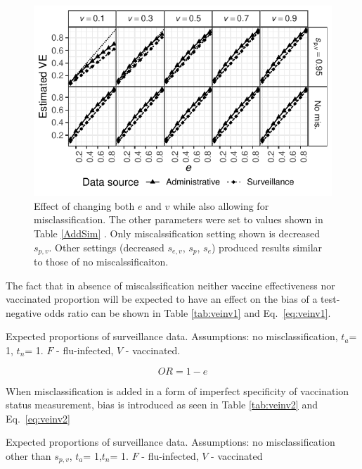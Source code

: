 \documentclass[11pt]{article}
\begin{document}
\pagebreak

\begin{figure}[H]
	\centering
		\includegraphics[width=0.85\linewidth]{../fig-veinv/veinv-limited.pdf}
		\caption{
Effect of changing both $e$ and $v$ while also allowing for misclassification. The other parameters were set to values shown in Table \ref{AddSim} . Only miscalssification setting shown is decreased $s_{p,v}$. Other settings (decreased $s_{e,v}$,  $s_p$, $s_e$) produced results similar to those of no miscalssificaiton. \label{veinv-summ}
		}	
\end{figure}

The fact that in absence of miscalssification neither vaccine effectiveness nor vaccinated proportion will be expected to have an effect on the bias of a test-negative odds ratio can be shown in Table \ref{tab:veinv1} and Eq.\ \ref{eq:veinv1}.

\begin{table}[h]
\centering
\caption{
Expected proportions of surveillance data.
Assumptions: no misclassification, $t_a$= 1, $t_n$= 1.
$F$ - flu-infected, $V$ - vaccinated.
 \label{tab:veinv1}
}
	
\end{table}

\begin{equation} \label{eq:veinv1}
OR = 1-e
\end{equation}

When misclassification is added in a form of imperfect specificity of vaccination status measurement, bias is introduced as seen in Table \ref{tab:veinv2} and Eq.\ \ref{eq:veinv2}

\begin{table}[h]
\centering
\caption{
Expected proportions of surveillance data. Assumptions: no misclassification other than $s_{p,v}$, $t_a$= 1,$t_n$= 1.
$F$ - flu-infected, $V$ - vaccinated
 \label{tab:veinv2}
}
	
\end{table}
\end{document}
